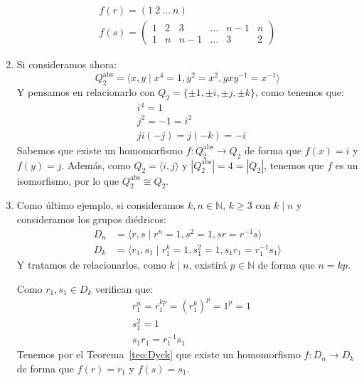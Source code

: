 \begin{ejemplo}
\begin{enumerate}
\begin{gather*}
                f(r) = (1\ 2\ \ldots\ n) \\
                f(s) = \left(\begin{array}{cccccc}
                        1 & 2 & 3 & \ldots & n-1 & n \\
                        1 & n & n-1 & \ldots & 3 & 2
                \end{array}\right)
            \end{gather*}
        \item Si consideramos ahora:
            \begin{equation*}
                Q_2^{\text{abs}} = \langle x,y\mid x^4=1, y^2=x^2, yxy^{-1}=x^{-1} \rangle 
            \end{equation*}
            Y pensamos en relacionarlo con $Q_2 = \{\pm 1, \pm i, \pm j, \pm k\}$, como tenemos que:
            \begin{align*}
                &i^4 = 1 \\
                &j^2 = -1 = i^2 \\
                &ji(-j) = j(-k) = -i 
            \end{align*}
            Sabemos que existe un homomorfismo $f:Q_2^{\text{abs}}\to Q_2$ de forma que $f(x) = i$ y $f(y) = j$. Además, como $Q_2 = \langle i, j \rangle $ y $|Q_2^{\text{abs}}| = 4 = |Q_2|$, tenemos que $f$ es un isomorfismo, por lo que $Q_2^{\text{abs}}\cong Q_2$.
        \item Como último ejemplo, si consideramos $k,n\in \mathbb{N}$, $k\geq 3$ con $k\mid n$ y consideramos los grupos diédricos:
            \begin{align*}
                D_n &= \langle r,s\mid r^n=1, s^2 = 1, sr=r^{-1}s \rangle  \\
                D_k &= \langle r_1,s_1\mid r_1^k=1, s_1^2 = 1, s_1r_1=r_1^{-1}s_1 \rangle  
            \end{align*}
            Y tratamos de relacionarlos, como $k\mid n$, existirá $p\in \mathbb{N}$ de forma que $n = kp$.

            Como $r_1,s_1\in D_k$ verifican que:
            \begin{align*}
                &r_1^n = r_1^{kp} = {(r_1^k)}^{p} = 1^p = 1 \\
                &s_1^2 = 1 \\
                &s_1r_1 = r_1^{-1}s_1
            \end{align*}
            Tenemos por el Teorema~\ref{teo:Dyck} que existe un homomorfismo $f:D_n\to D_k$ de forma que $f(r) = r_1$ y $f(s) = s_1$.
    \end{enumerate}
\end{ejemplo}

